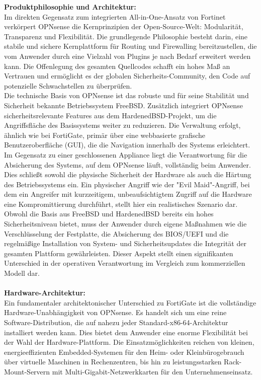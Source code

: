 \textbf{Produktphilosophie und Architektur:}\\
Im direkten Gegensatz zum integrierten All-in-One-Ansatz von Fortinet verkörpert OPNsense die Kernprinzipien der Open-Source-Welt: Modularität, Transparenz und Flexibilität. Die grundlegende Philosophie besteht darin, eine stabile und sichere Kernplattform für Routing und Firewalling bereitzustellen, die vom Anwender durch eine Vielzahl von Plugins je nach Bedarf erweitert werden kann. Die Offenlegung des gesamten Quellcodes schafft ein hohes Maß an Vertrauen und ermöglicht es der globalen Sicherheits-Community, den Code auf potenzielle Schwachstellen zu überprüfen.\cite{Fork}\\

Die technische Basis von OPNsense ist das robuste und für seine Stabilität und Sicherheit bekannte Betriebssystem FreeBSD. Zusätzlich integriert OPNsense sicherheitsrelevante Features aus dem HardenedBSD-Projekt, um die Angriffsfläche des Basissystems weiter zu reduzieren. Die Verwaltung erfolgt, ähnlich wie bei FortiGate, primär über eine webbasierte grafische Benutzeroberfläche (GUI), die die Navigation innerhalb des Systems erleichtert.\\

Im Gegensatz zu einer geschlossenen Appliance liegt die Verantwortung für die Absicherung des Systems, auf dem OPNsense läuft, vollständig beim Anwender. Dies schließt sowohl die physische Sicherheit der Hardware als auch die Härtung des Betriebssystems ein. Ein physischer Angriff wie der "Evil Maid"-Angriff, bei dem ein Angreifer mit kurzzeitigem, unbeaufsichtigtem Zugriff auf die Hardware eine Kompromittierung durchführt, stellt hier ein realistisches Szenario dar. Obwohl die Basis aus FreeBSD und HardenedBSD bereits ein hohes Sicherheitsniveau bietet, muss der Anwender durch eigene Maßnahmen wie die Verschlüsselung der Festplatte, die Absicherung des BIOS/UEFI und die regelmäßige Installation von System- und Sicherheitsupdates die Integrität der gesamten Plattform gewährleisten. Dieser Aspekt stellt einen signifikanten Unterschied in der operativen Verantwortung im Vergleich zum kommerziellen Modell dar.\\\\

\textbf{Hardware-Architektur:}\\
Ein fundamentaler architektonischer Unterschied zu FortiGate ist die vollständige Hardware-Unabhängigkeit von OPNsense. Es handelt sich um eine reine Software-Distribution, die auf nahezu jeder Standard-x86-64-Architektur installiert werden kann. Dies bietet dem Anwender eine enorme Flexibilität bei der Wahl der Hardware-Plattform. Die Einsatzmöglichkeiten reichen von kleinen, energieeffizienten Embedded-Systemen für den Heim- oder Kleinbürogebrauch über virtuelle Maschinen in Rechenzentren, bis hin zu leistungsstarken Rack-Mount-Servern mit Multi-Gigabit-Netzwerkkarten für den Unternehmenseinsatz.\\

